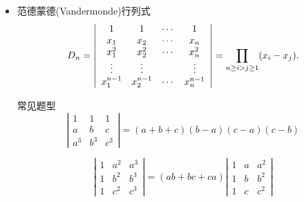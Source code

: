 \begin{frame}
  \begin{footnotesize}
    \begin{itemize}
    \item 范德蒙德(Vandermonde)行列式
        $$
        D_n = \left|
        \begin{array}{cccc}
          1        &  1        & \cdots &    1     \\                    
          x_1      &  x_2      & \cdots &    x_n    \\ 
          x_1^2    &  x_2^2     & \cdots &   x_n^2   \\ 
          \vdots      &  \vdots      &     &    \vdots      \\
          x_1^{n-1} & x_2^{n-1} &  \cdots &  x_n^{n-1}
        \end{array}
        \right|
        = \prod_{n \ge i > j \ge 1}(x_i-x_j).
        $$
        
        \begin{exampleblock}{常见题型}
        $$
        \left|
        \begin{array}{ccc}
          1   &   1   &   1\\
          a   &   b   &   c\\
          a^3 &   b^3 &   c^3
        \end{array}
        \right|=(a+b+c)(b-a)(c-a)(c-b)
        $$\vspace{0.1in}
        
        $$
        \left|
        \begin{array}{ccc}
          1&a^2&a^3\\
          1&b^2&b^3\\
          1&c^2&c^3
        \end{array}
        \right|=(ab+bc+ca)
        \left|
        \begin{array}{ccc}
          1&a&a^2\\
          1&b&b^2\\
          1&c&c^2
        \end{array}
        \right|
        $$
      \end{exampleblock}

    \end{itemize}
  \end{footnotesize}
\end{frame}
